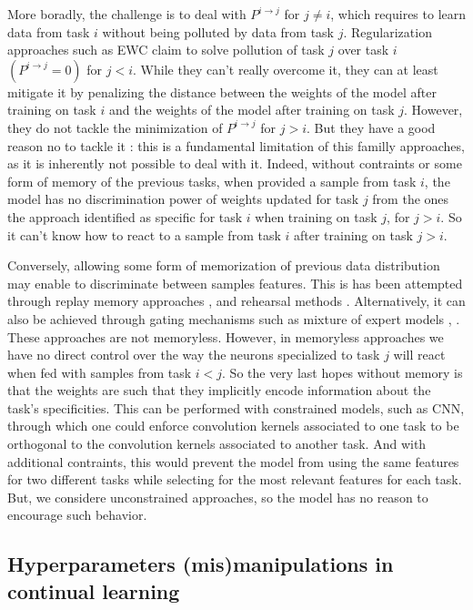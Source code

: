 \documentclass[twocolumn]{article}
\begin{document}
\vspace{1mm}
\noindent
More boradly, the challenge is to deal with $P^{i\rightarrow j}$ for $j \neq i$, which requires to learn data from task $i$ without being polluted by data from task $j$. Regularization approaches such as EWC claim to solve pollution of task $j$ over task $i$ $(P^{i\rightarrow j}=0)$ for $j<i$. While they can't really overcome it, they can at least mitigate it by penalizing the distance between the weights of the model after training on task $i$ and the weights of the model after training on task $j$. However, they do not tackle the minimization of $P^{i\rightarrow j}$ for $j>i$. But they have a good reason no to tackle it : this is a fundamental limitation of this familly approaches, as it is inherently not possible to deal with it. Indeed, without contraints or some form of memory of the previous tasks, when provided a sample from task $i$, the model has no discrimination power of weights updated for task $j$ from the ones the approach identified as specific for task $i$ when training on task $j$, for $j>i$. So it can't know how to react to a sample from task $i$ after training on task $j>i$.

\vspace{1mm}
\noindent
Conversely, allowing some form of memorization of previous data distribution may enable to discriminate between samples features. This is has been attempted through replay memory approaches \cite{replay1}, \cite{replay2} and rehearsal methods \cite{rehearsal}. Alternatively, it can also be achieved through gating mechanisms such as mixture of expert models \cite{moe}, \cite{dmoe}. These approaches are not memoryless. However, in memoryless approaches we have no direct control over the way the neurons specialized to task $j$ will react when fed with samples from task $i<j$. So the very last hopes without memory is that the weights are such that they implicitly encode information about the task's specificities. This can be performed with constrained models, such as CNN, through which one could enforce convolution kernels associated to one task to be orthogonal to the convolution kernels associated to another task. And with additional contraints, this would prevent the model from using the same features for two different tasks while selecting for the most relevant features for each task. But, we considere unconstrained approaches, so the model has no reason to encourage such behavior.


\subsection{Hyperparameters (mis)manipulations in continual learning}
\end{document}

